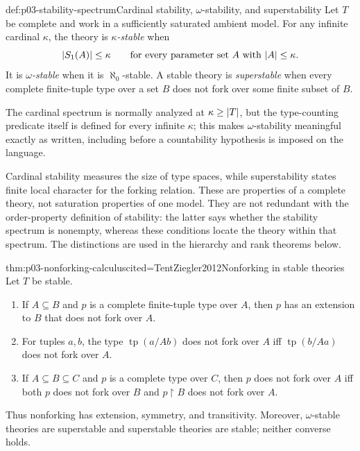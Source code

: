 \begin{hbdefinition}{def:p03-stability-spectrum}{Cardinal stability, \(\omega\)-stability, and superstability}
Let \(T\) be complete and work in a sufficiently saturated ambient model.
For any infinite cardinal \(\kappa\), the theory is
\emph{\(\kappa\)-stable} when
\[
  \lvert S_1(A)\rvert\leq\kappa
  \qquad\text{for every parameter set }A\text{ with }\lvert A\rvert\leq\kappa.
\]
It is \emph{\(\omega\)-stable} when it is \(\aleph_0\)-stable.  A stable
theory is \emph{superstable} when every complete finite-tuple type over a set
\(B\) does not fork over some finite subset of \(B\).

The cardinal spectrum is normally analyzed at \(\kappa\geq\lvert T\rvert\), but the
type-counting predicate itself is defined for every infinite \(\kappa\); this
makes \(\omega\)-stability meaningful exactly as written, including before a
countability hypothesis is imposed on the language.

Cardinal stability measures the size of type spaces, while superstability
states finite local character for the forking relation.  These are properties
of a complete theory, not saturation properties of one model.  They are not
redundant with the order-property definition of stability: the latter says
whether the stability spectrum is nonempty, whereas these conditions locate
the theory within that spectrum.  The distinctions are used in the hierarchy
and rank theorems below.
\end{hbdefinition}

\begin{hbtheorem}{thm:p03-nonforking-calculus}{cited=TentZiegler2012}{Nonforking in stable theories}
Let \(T\) be stable.
\begin{enumerate}
  \item If \(A\subseteq B\) and \(p\) is a complete finite-tuple type over
        \(A\), then \(p\) has an extension to \(B\) that does not fork over
        \(A\).
  \item For tuples \(a,b\), the type \(\operatorname{tp}(a/Ab)\) does not
        fork over \(A\) iff \(\operatorname{tp}(b/Aa)\) does not fork over
        \(A\).
  \item If \(A\subseteq B\subseteq C\) and \(p\) is a complete type over
        \(C\), then \(p\) does not fork over \(A\) iff both \(p\) does not
        fork over \(B\) and \(p\mathbin{\upharpoonright}B\) does not fork
        over \(A\).
\end{enumerate}
Thus nonforking has extension, symmetry, and transitivity.  Moreover,
\(\omega\)-stable theories are superstable and superstable theories are
stable; neither converse holds.
\end{hbtheorem}

